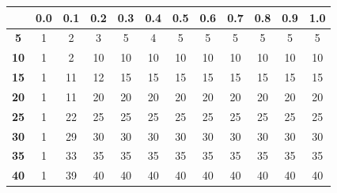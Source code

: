 \documentclass[a4paper,12pt]{article}
\begin{document}
\begin{center}
\vspace*{0.7cm}
\begin{tabular}{|c|c|c|c|c|c|c|c|c|c|c|c|}
\hline
& \textbf{0.0}\bigstrut & \textbf{0.1} & \textbf{0.2} & \textbf{0.3} & \textbf{0.4} & \textbf{0.5} & \textbf{0.6} & \textbf{0.7} & \textbf{0.8} & \textbf{0.9} & \textbf{1.0} \\\hline
\textbf{5}\bigstrut & 1 & 2 & 3 & 5 & 4 & 5 & 5 & 5 & 5 & 5 & 5 \\\hline
\textbf{10}\bigstrut & 1 & 2 & 10 & 10 & 10 & 10 & 10 & 10 & 10 & 10 & 10 \\\hline
\textbf{15}\bigstrut & 1 & 11 & 12 & 15 & 15 & 15 & 15 & 15 & 15 & 15 & 15 \\\hline
\textbf{20}\bigstrut & 1 & 11 & 20 & 20 & 20 & 20 & 20 & 20 & 20 & 20 & 20 \\\hline
\textbf{25}\bigstrut & 1 & 22 & 25 & 25 & 25 & 25 & 25 & 25 & 25 & 25 & 25 \\\hline
\textbf{30}\bigstrut & 1 & 29 & 30 & 30 & 30 & 30 & 30 & 30 & 30 & 30 & 30 \\\hline
\textbf{35}\bigstrut & 1 & 33 & 35 & 35 & 35 & 35 & 35 & 35 & 35 & 35 & 35 \\\hline
\textbf{40}\bigstrut & 1 & 39 & 40 & 40 & 40 & 40 & 40 & 40 & 40 & 40 & 40 \\\hline
\end{tabular}
\captionsetup{justification=centering,margin=1.05cm}
\label{tab:tab2}
\end{center}
\end{document}
